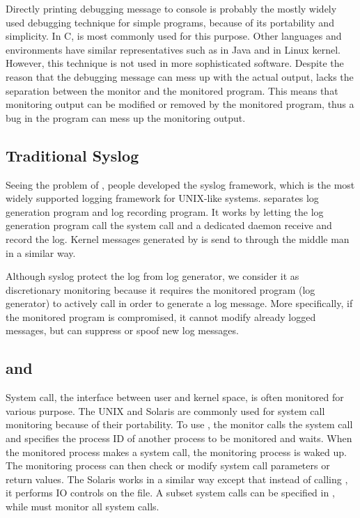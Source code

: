Directly printing debugging message to console
is probably the mostly widely used debugging technique
for simple programs, because of its portability and simplicity.
In C,  is most commonly used for this purpose.
Other languages and environments have similar representatives
such as  in Java and
 in Linux kernel.
However, this technique is not used in more sophisticated software.
Despite the reason that the debugging message can mess up
with the actual output,  lacks the
separation between the monitor and the monitored program.
This means that monitoring output can be modified or removed by the monitored
program, thus a bug in the program can mess up the monitoring output.


\subsection{Traditional Syslog}
\label{sec:syslog}

Seeing the problem of , people developed the syslog
framework, which is the most widely supported logging framework for UNIX-like systems.
 separates log generation program and log recording program.
It works by letting the log generation program call the 
system call and a dedicated daemon  receive and record the log.
Kernel messages generated by  is send to  through
the middle man  in a similar way.

Although syslog protect the log from log generator,
we consider it as discretionary monitoring because it
requires the monitored program (log generator) to actively call
 in order to generate a log message.
More specifically, if the monitored program is compromised,
it cannot modify already logged messages, but can suppress or spoof
new log messages.

\subsection{ and }
\label{sec:ptrace}

System call, the interface between user and kernel space,
is often monitored for various purpose.
The UNIX  and Solaris  are commonly
used for system call monitoring because of their portability.
To use , the monitor calls the  system call
and specifies the process ID of another process to be monitored and waits.
When the monitored process makes a system call, the monitoring
process is waked up.
The monitoring process can then check or modify
system call parameters or return values.
The Solaris  works in a similar way except that
instead of calling , it performs IO controls on the
 file.
A subset system calls can be specified in ,
while  must monitor all system calls.

